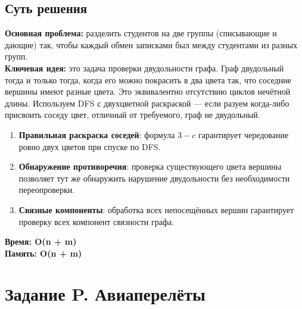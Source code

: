 \documentclass[a4paper,12pt]{article}
\begin{document}
    \subsection*{Суть решения}
    \textbf{Основная проблема:} разделить студентов на две группы (списывающие и дающие) так, чтобы каждый обмен записками был между студентами из разных групп.\\
    \textbf{Ключевая идея:} это задача проверки двудольности графа. Граф двудольный тогда и только тогда, когда его можно покрасить в два цвета так, что соседние вершины имеют разные цвета. Это эквивалентно отсутствию циклов нечётной длины. Используем DFS с двухцветной раскраской — если разуем когда-либо присвоить соседу цвет, отличный от требуемого, граф не двудольный.\\
    \begin{enumerate}
        \item \textbf{Правильная раскраска соседей}: формула $3 - c$ гарантирует чередование ровно двух цветов при спуске по DFS.
        \item \textbf{Обнаружение противоречия}: проверка существующего цвета вершины позволяет тут же обнаружить нарушение двудольности без необходимости переопроверки.
        \item \textbf{Связные компоненты}: обработка всех непосещённых вершин гарантирует проверку всех компонент связности графа.
    \end{enumerate}
    \textbf{Время: O(n + m)}\\
    \textbf{Память: O(n + m)}


    \newpage


    \section{Задание P. Авиаперелёты}

    
\end{document}
